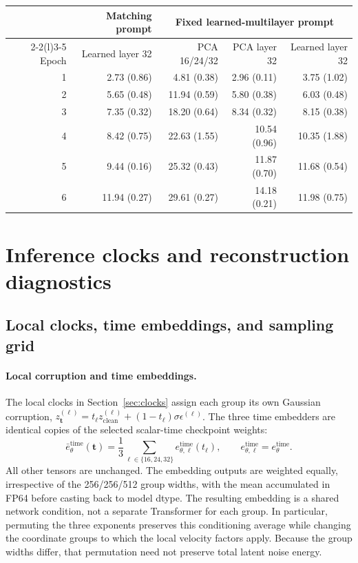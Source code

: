\documentclass{article}
\newenvironment{revision}{\begingroup\color{blue}}{\endgroup}
\begin{document}
\begin{revision}
\begin{table}[htbp]
\label{tab:learned32curve}
\begin{tabular}{@{}rrrrr@{}}\toprule
& Matching prompt & \multicolumn{3}{c}{Fixed learned-multilayer prompt}\\
\cmidrule(lr){2-2}\cmidrule(l){3-5}
Epoch & Learned layer 32 & PCA 16/24/32 & PCA layer 32 & Learned layer 32\\\midrule
1 & 2.73 (0.86) & 4.81 (0.38) & 2.96 (0.11) & 3.75 (1.02)\\
2 & 5.65 (0.48) & 11.94 (0.59) & 5.80 (0.38) & 6.03 (0.48)\\
3 & 7.35 (0.32) & 18.20 (0.64) & 8.34 (0.32) & 8.15 (0.38)\\
4 & 8.42 (0.75) & 22.63 (1.55) & 10.54 (0.96) & 10.35 (1.88)\\
5 & 9.44 (0.16) & 25.32 (0.43) & 11.87 (0.70) & 11.68 (0.54)\\
6 & 11.94 (0.27) & 29.61 (0.27) & 14.18 (0.21) & 11.98 (0.75)\\
\bottomrule\end{tabular}
\end{table}
\end{revision}
\clearpage

\section{Inference clocks and reconstruction diagnostics}
\label{app:inferenceclocks}

\subsection{Local clocks, time embeddings, and sampling grid}

\paragraph{Local corruption and time embeddings.}
The local clocks in Section~\ref{sec:clocks} assign each group its own Gaussian corruption, $z_{\bm t}^{(\ell)}=t_\ell z_{\mathrm{clean}}^{(\ell)}+(1-t_\ell)\sigma\epsilon^{(\ell)}$. The three time embedders are identical copies of the selected scalar-time checkpoint weights:
\begin{equation}
 \bar e_\theta^{\mathrm{time}}(\bm t)
 =\frac{1}{3}\sum_{\ell\in\{16,24,32\}}e_{\theta,\ell}^{\mathrm{time}}(t_\ell),
 \qquad e_{\theta,\ell}^{\mathrm{time}}=e_\theta^{\mathrm{time}}.
 \label{eq:asynctimeembedding}
\end{equation}
All other tensors are unchanged. The embedding outputs are weighted equally, irrespective of the 256/256/512 group widths, with the mean accumulated in FP64 before casting back to model dtype. The resulting embedding is a shared network condition, not a separate Transformer for each group. In particular, permuting the three exponents preserves this conditioning average while changing the coordinate groups to which the local velocity factors apply. Because the group widths differ, that permutation need not preserve total latent noise energy.
\end{document}
